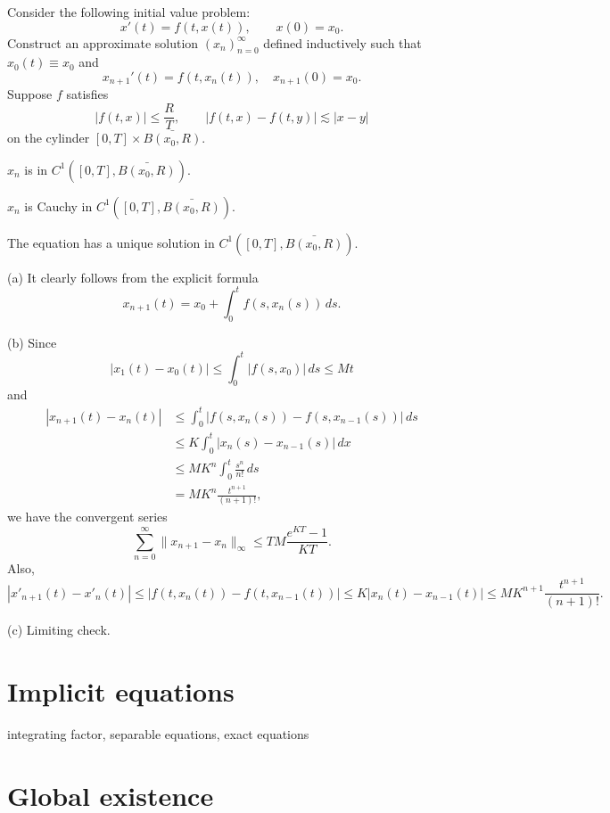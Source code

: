 \documentclass{../note}
\begin{document}
\begin{prb}
Consider the following initial value problem:
\[x'(t)=f(t,x(t)),\qquad x(0)=x_0.\]
Construct an approximate solution $(x_n)_{n=0}^\infty$ defined inductively such that $x_0(t)\equiv x_0$ and
\[x_{n+1}'(t)=f(t,x_n(t)),\quad x_{n+1}(0)=x_0.\]
Suppose $f$ satisfies
\[|f(t,x)|\le \frac RT,\qquad|f(t,x)-f(t,y)|\lesssim|x-y|\]
on the cylinder $[0,T]\times\bar{B(x_0,R)}$.
\begin{parts}
\item $x_n$ is in $C^1([0,T],\bar{B(x_0,R)})$.
\item $x_n$ is Cauchy in $C^1([0,T],\bar{B(x_0,R)})$.
\item The equation has a unique solution in $C^1([0,T],\bar{B(x_0,R)})$.
\end{parts}
\end{prb}
\begin{pf}
(a)
It clearly follows from the explicit formula
\[x_{n+1}(t)=x_0+\int_0^tf(s,x_n(s))\,ds.\]

(b)
Since
\[|x_1(t)-x_0(t)|\le\int_0^t|f(s,x_0)|\,ds\le Mt\]
and
\begin{align*}
|x_{n+1}(t)-x_n(t)|
&\le\int_0^t|f(s,x_n(s))-f(s,x_{n-1}(s))|\,ds\\
&\le K\int_0^t|x_n(s)-x_{n-1}(s)|\,dx\\
&\le MK^n\int_0^t\frac{s^n}{n!}\,ds\\
&=MK^n\frac{t^{n+1}}{(n+1)!},
\end{align*}
we have the convergent series
\[\sum_{n=0}^\infty\|x_{n+1}-x_n\|_\infty\le TM\frac{e^{KT}-1}{KT}.\]
Also,
\[|x'_{n+1}(t)-x'_n(t)|\le|f(t,x_n(t))-f(t,x_{n-1}(t))|\le K|x_n(t)-x_{n-1}(t)|\le MK^{n+1}\frac{t^{n+1}}{(n+1)!}.\]

(c)
Limiting check.
\end{pf}

\begin{prb}
\end{prb}

\begin{prb}
\end{prb}


\section{Implicit equations}
integrating factor, separable equations, exact equations


\section{Global existence}
\begin{prb}

\end{prb}
\begin{prb}

\end{prb}
\end{document}
